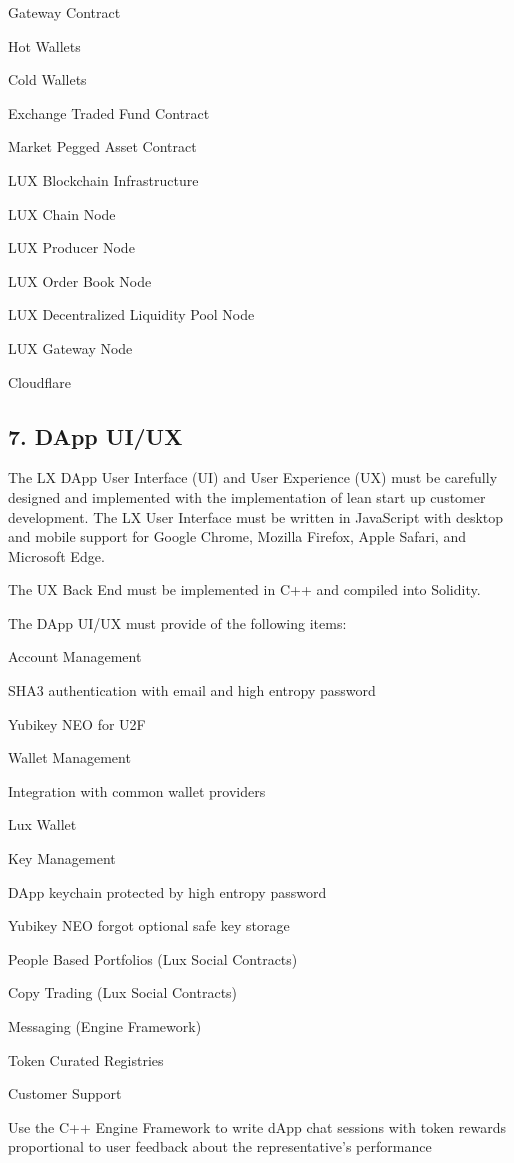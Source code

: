\documentclass[11pt]{article}
\begin{document}
Gateway Contract


Hot Wallets


Cold Wallets


Exchange Traded Fund Contract


Market Pegged Asset Contract


LUX Blockchain Infrastructure


LUX Chain Node


LUX Producer Node


LUX Order Book Node


LUX Decentralized Liquidity Pool Node


LUX Gateway Node


Cloudflare


\subsection{7. DApp UI/UX}

The LX DApp User Interface (UI) and User Experience (UX) must be carefully designed and implemented with the implementation of lean start up customer development. The LX User Interface must be written in JavaScript with desktop and mobile support for Google Chrome, Mozilla Firefox, Apple Safari, and Microsoft Edge.


The UX Back End must be implemented in C++ and compiled into Solidity.


The DApp UI/UX must provide of the following items:


Account Management


SHA3 authentication with email and high entropy password


Yubikey NEO for U2F


Wallet Management


Integration with common wallet providers


Lux Wallet


Key Management


DApp keychain protected by high entropy password


Yubikey NEO forgot optional safe key storage


People Based Portfolios (Lux  Social Contracts)


Copy Trading (Lux  Social Contracts)


Messaging (Engine Framework)


Token Curated Registries


Customer Support


Use the C++ Engine Framework to write dApp chat sessions with token rewards proportional to user feedback about the representative's performance
\end{document}

